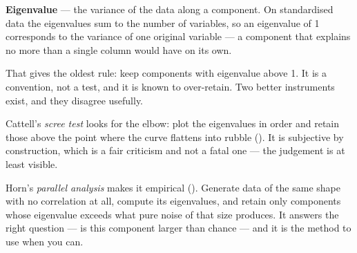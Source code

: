 \documentclass[
  letterpaper,
  10pt,
  twoside,
  openright,
  numbers=noenddot,
  chapterprefix=true]{scrbook}
\begin{document}
\begin{qmibdefinition}

{\textbf{Eigenvalue}} --- the variance of the data along a component. On
standardised data the eigenvalues sum to the number of variables, so an
eigenvalue of 1 corresponds to the variance of one original variable ---
a component that explains no more than a single column would have on its
own.

\end{qmibdefinition}

That gives the oldest rule: keep components with eigenvalue above 1. It
is a convention, not a test, and it is known to over-retain. Two better
instruments exist, and they disagree usefully.

Cattell's \emph{scree test} looks for the elbow: plot the eigenvalues in
order and retain those above the point where the curve flattens into
rubble (). It is subjective by
construction, which is a fair criticism and not a fatal one --- the
judgement is at least visible.

Horn's \emph{parallel analysis} makes it empirical
(). Generate data of the same shape
with no correlation at all, compute its eigenvalues, and retain only
components whose eigenvalue exceeds what pure noise of that size
produces. It answers the right question --- is this component larger
than chance --- and it is the method to use when you can.
\end{document}
